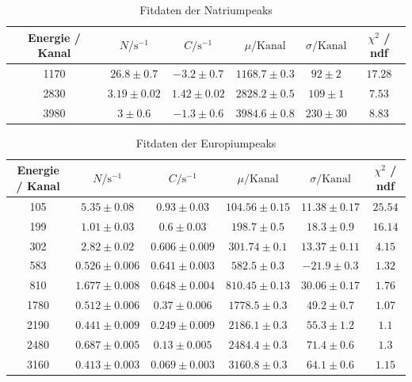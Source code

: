 \documentclass[12pt,listof=totoc]{scrartcl}
\begin{document}
\begin{table}[h!]
	\footnotesize\centering
	\begin{tabular}{|c||c|c|c|c||c|}
		\hline
		Energie / Kanal&$N/\mathrm{s^{-1}}$&$C/\mathrm{s^{-1}}$&$\mu/\mathrm{Kanal}$&$\sigma/\mathrm{Kanal}$&$\chi^2$ / ndf\\\hline\hline1170&$26.8\pm0.7$&$-3.2\pm0.7$&$1168.7\pm0.3$&$92\pm2$&$17.28$\\
		2830&$3.19\pm0.02$&$1.42\pm0.02$&$2828.2\pm0.5$&$109\pm1$&$7.53$\\
		3980&$3\pm0.6$&$-1.3\pm0.6$&$3984.6\pm0.8$&$230\pm30$&$8.83$\\
		\hline\end{tabular}
	\caption{Fitdaten der Natriumpeaks\label{natriumtable}}
\end{table}


\begin{table}[h!]
	\footnotesize\centering
	\begin{tabular}{|c||c|c|c|c||c|}
		\hline
		Energie / Kanal&$N/\mathrm{s^{-1}}$&$C/\mathrm{s^{-1}}$&$\mu/\mathrm{Kanal}$&$\sigma/\mathrm{Kanal}$&$\chi^2$ / ndf\\\hline\hline105&$5.35\pm0.08$&$0.93\pm0.03$&$104.56\pm0.15$&$11.38\pm0.17$&$25.54$\\
		199&$1.01\pm0.03$&$0.6\pm0.03$&$198.7\pm0.5$&$18.3\pm0.9$&$16.14$\\
		302&$2.82\pm0.02$&$0.606\pm0.009$&$301.74\pm0.1$&$13.37\pm0.11$&$4.15$\\
		583&$0.526\pm0.006$&$0.641\pm0.003$&$582.5\pm0.3$&$-21.9\pm0.3$&$1.32$\\
		810&$1.677\pm0.008$&$0.648\pm0.004$&$810.45\pm0.13$&$30.06\pm0.17$&$1.76$\\
		1780&$0.512\pm0.006$&$0.37\pm0.006$&$1778.5\pm0.3$&$49.2\pm0.7$&$1.07$\\
		2190&$0.441\pm0.009$&$0.249\pm0.009$&$2186.1\pm0.3$&$55.3\pm1.2$&$1.1$\\
		2480&$0.687\pm0.005$&$0.13\pm0.005$&$2484.4\pm0.3$&$71.4\pm0.6$&$1.3$\\
		3160&$0.413\pm0.003$&$0.069\pm0.003$&$3160.8\pm0.3$&$64.1\pm0.6$&$1.15$\\
		\hline\end{tabular}
	\caption{Fitdaten der Europiumpeaks\label{europiumtable}}
\end{table}
\end{document}
